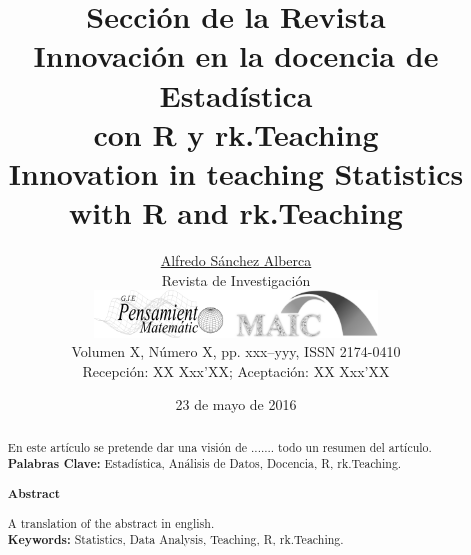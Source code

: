 \documentclass[a4paper,10pt,twoside]{article}
\newcommand{\rkteaching}{\textsf{rk.Teaching}}
\begin{document}
\renewcommand{\tablename}{Tabla} 

\title{\vspace{-8mm}Sección de la Revista\\\vspace{4mm}
Innovación en la docencia de Estadística\\ con R y rk.Teaching\\\vspace{4mm}
Innovation in teaching Statistics\\ with R and rk.Teaching\vspace{-3mm}}  %
\author{\href{mailto:asalber@ceu.es}{Alfredo Sánchez Alberca}\\ \vspace{2mm} %
\scriptsize Revista de Investigación\\
\small
\href{http://www2.caminos.upm.es/Departamentos/matematicas/revistapm/}{\includegraphics[width=75.2mm]{logosrev.png}}\\
\scriptsize Volumen X, Número X, pp. xxx--yyy, ISSN 2174-0410\vspace{-2mm}\\ 
\scriptsize Recepción: XX Xxx'XX; Aceptación: XX Xxx'XX} %
\date{23 de mayo de 2016}
\maketitle

\begin{abstract}
En este artículo se pretende dar una visión de ....... todo un resumen del artículo.\\
\newline
\noindent\textbf{Palabras Clave:} Estadística, Análisis de Datos, Docencia, R, \rkteaching.
\newline
\begin{center}
 \textbf{Abstract}
\end{center}

\vspace{1.2mm}A translation of the abstract in english.\\
\newline
\noindent\textbf{Keywords:} Statistics, Data Analysis, Teaching, R, \rkteaching.

\end{abstract}
\end{document}
